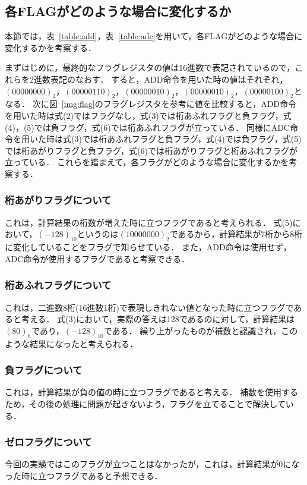 \documentclass[dvipdfmx]{jsarticle}
\begin{document}
\subsection{各FLAGがどのような場合に変化するか}
\label{sec:flag}
本節では，表~\ref{table:add}，表~\ref{table:adc}を用いて，各FLAGがどのような場合に変化するかを考察する．

まずはじめに，最終的なフラグレジスタの値は16進数で表記されているので，これらを2進数表記のなおす．
すると，ADD命令を用いた時の値はそれぞれ，$(0000 0000)_2$，$(0000 0110)_2$，$(0000 0010)_2$，$(0000 0010)_2$，$(0000 0100)_2$となる．
次に図~\ref{img:flag}のフラグレジスタを参考に値を比較すると，ADD命令を用いた時は式(2)ではフラグなし，式(3)では桁あふれフラグと負フラグ，式(4)，(5)では負フラグ，式(6)では桁あふれフラグが立っている．
同様にADC命令を用いた時は式(3)では桁あふれフラグと負フラグ，式(4)では負フラグ，式(5)では桁あがりフラグと負フラグ，式(6)では桁あがりフラグと桁あふれフラグが立っている．
これらを踏まえて，各フラグがどのような場合に変化するかを考察する．

\subsubsection{桁あがりフラグについて}
これは，計算結果の桁数が増えた時に立つフラグであると考えられる．
式(5)において，$(-128)_{10}$というのは$(10000000)_2$であるから，計算結果が7桁から8桁に変化していることをフラグで知らせている．
また，ADD命令は使用せず，ADC命令が使用するフラグであると考察できる．

\subsubsection{桁あふれフラグについて}
これは，二進数8桁(16進数1桁)で表現しきれない値となった時に立つフラグであると考える．
式(3)において，実際の答えは128であるのに対して，計算結果は$(80)_h$であり，$(-128)_{10}$である．
繰り上がったものが補数と認識され，このような結果になったと考えられる．

\subsubsection{負フラグについて}
これは，計算結果が負の値の時に立つフラグであると考える．
補数を使用するため，その後の処理に問題が起きないよう，フラグを立てることで解決している．

\subsubsection{ゼロフラグについて}
今回の実験ではこのフラグが立つことはなかったが，これは，計算結果が0になった時に立つフラグであると予想できる．
\end{document}
